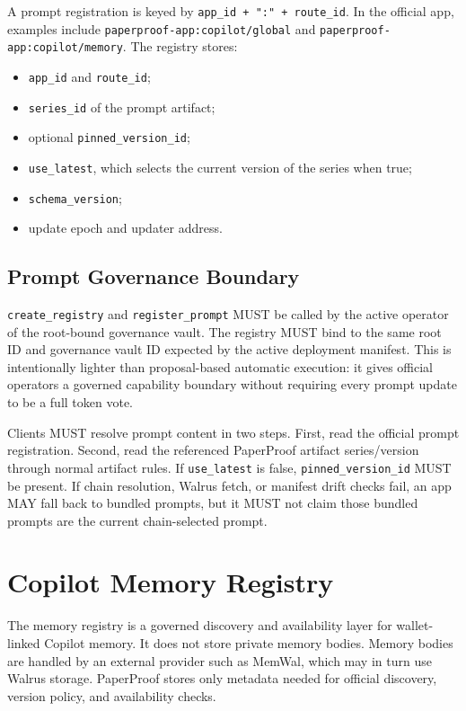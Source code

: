 \documentclass[11pt]{article}
\newcommand{\code}[1]{\texttt{#1}}
\begin{document}
A prompt registration is keyed by \code{app\_id + ":" + route\_id}. In the
official app, examples include \code{paperproof-app:copilot/global} and
\code{paperproof-app:copilot/memory}. The registry stores:

\begin{itemize}[leftmargin=*]
  \item \code{app\_id} and \code{route\_id};
  \item \code{series\_id} of the prompt artifact;
  \item optional \code{pinned\_version\_id};
  \item \code{use\_latest}, which selects the current version of the series when true;
  \item \code{schema\_version};
  \item update epoch and updater address.
\end{itemize}

\subsection{Prompt Governance Boundary}

\code{create\_registry} and \code{register\_prompt} MUST be called by the active
operator of the root-bound governance vault. The registry MUST bind to the same
root ID and governance vault ID expected by the active deployment manifest.
This is intentionally lighter than proposal-based automatic execution: it gives
official operators a governed capability boundary without requiring every prompt
update to be a full token vote.

Clients MUST resolve prompt content in two steps. First, read the official
prompt registration. Second, read the referenced PaperProof artifact
series/version through normal artifact rules. If \code{use\_latest} is false,
\code{pinned\_version\_id} MUST be present. If chain resolution, Walrus fetch, or
manifest drift checks fail, an app MAY fall back to bundled prompts, but it MUST
not claim those bundled prompts are the current chain-selected prompt.

\section{Copilot Memory Registry}

The memory registry is a governed discovery and availability layer for
wallet-linked Copilot memory. It does not store private memory bodies. Memory
bodies are handled by an external provider such as MemWal, which may in turn use
Walrus storage. PaperProof stores only metadata needed for official discovery,
version policy, and availability checks.
\end{document}
